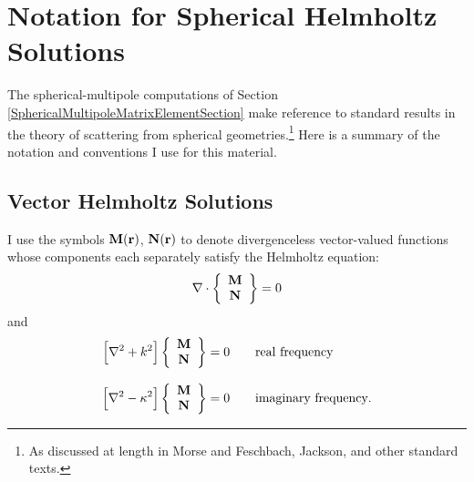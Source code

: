 \newpage
\section{Notation for Spherical Helmholtz Solutions}
\label{SphericalHelmoltzAppendix}

The spherical-multipole computations of 
Section \ref{SphericalMultipoleMatrixElementSection}
make reference to standard results in the theory of 
scattering from spherical geometries.\footnote{As discussed 
at length in Morse and Feschbach, Jackson, and other 
standard texts.} Here is a summary of the notation 
and conventions I use for this material.

\subsection{Vector Helmholtz Solutions}

I use the symbols $\mathbf{M}(\mathbf{r})$, $\mathbf{N}(\mathbf{r})$ to denote 
divergenceless vector-valued functions whose components each 
separately satisfy the Helmholtz equation:
$$
 \nabla \cdot 
 \left\{ \begin{array}{c} \mathbf{M} \\ \mathbf{N} \end{array} \right\} 
  = 0 
$$
and
\begin{align*}
 \Big[\nabla^2 + k^2 \Big] 
 \left\{ \begin{array}{c} \mathbf{M} \\ \mathbf{N} \end{array} \right\} 
 &= 0 
 \qquad \text{real frequency}
  \\[8pt]
 \Big[\nabla^2 - \kappa^2 \Big] 
 \left\{ \begin{array}{c} \mathbf{M} \\ \mathbf{N} \end{array} \right\} 
 &= 0 
 \qquad \text{imaginary frequency}.
\end{align*}
%
